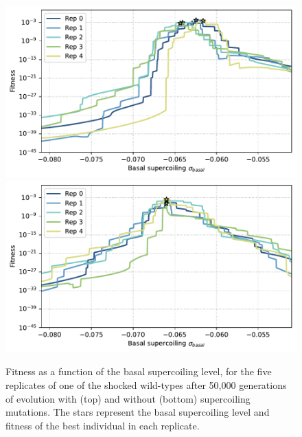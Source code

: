 \begin{figure}
\centering
\includegraphics[width=\textwidth]{epistasis/img/with-sc/fitness_landscapes_evolved_wt_01_shuffle_00.pdf}
\includegraphics[width=\textwidth]{epistasis/img/control/fitness_landscapes_evolved_wt_01_shuffle_00.pdf}
\caption[Supercoiling fitness landscapes after evolution after an environmental shock, with and without supercoiling mutations]{Fitness as a function of the basal supercoiling level, for the five replicates of one of the shocked wild-types after 50,000 generations of evolution with (top) and without (bottom) supercoiling mutations.
The stars represent the basal supercoiling level and fitness of the best individual in each replicate.}
\label{fig:epistasis:fitness-landscapes-evolved}
\end{figure}

